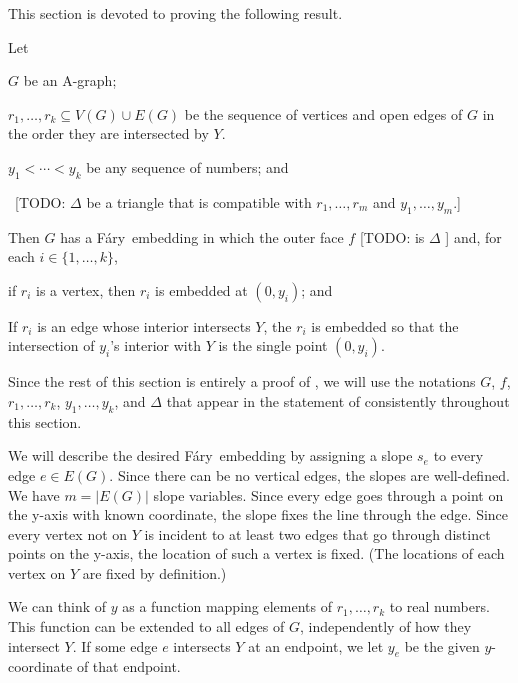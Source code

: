 \documentclass{patmorin}
\newcommand{\Fary}{Fáry}
\begin{document}
This section is devoted to proving the following result.

\begin{thm}
   Let
   \begin{compactenum}
     \item  $G$ be an A-graph;
     \item $r_1,\ldots,r_k \subseteq V(G)\cup E(G)$ be the sequence of vertices and open edges
           of $G$ in the order they are intersected by $Y$.
     \item $y_1<\cdots<y_k$ be any sequence of numbers; and
     \item \ [TODO: $\Delta$ be a triangle that is compatible with 
           $r_1,\ldots,r_m$ and $y_1,\ldots,y_m$.]
  \end{compactenum}
   Then $G$ has a
   \Fary\ embedding in which the outer face $f$ [TODO: is $\Delta$ ]
   and, for each $i\in\{1,\ldots,k\}$, 
   \begin{compactenum}
       \item if $r_i$ is a vertex, then $r_i$ is embedded at $(0,y_i)$; and 
       \item If $r_i$ is an edge whose interior intersects $Y$, the $r_i$
         is embedded so that the intersection of $y_i$'s interior with
         $Y$ is the single point $(0,y_i)$.
   \end{compactenum}
\end{thm}
Since the rest of this section is entirely a proof of ,
we will use the notations $G$, $f$, $r_1,\ldots,r_k$, $y_1,\ldots,y_k$,
and $\Delta$ that appear in the statement of  consistently
throughout this section.

We will describe the desired \Fary\ embedding by assigning a slope $s_e$
to every edge $e\in E(G)$.  Since there can be no vertical edges,
the slopes are well-defined.  We have $m=|E(G)|$ slope variables.
Since every edge goes through a point on the y-axis with known
coordinate, the slope fixes the line through the edge.  Since every
vertex not on $Y$ is incident to at least two edges that go through
distinct points on the y-axis, the location of such a vertex is fixed.
(The locations of each vertex on $Y$ are fixed by definition.)

We can think of $y$ as a function mapping elements of $r_1,\ldots,r_k$
to real numbers.  This function can be extended to all edges of $G$,
independently of how they intersect $Y$. If some edge $e$ intersects
$Y$ at an endpoint, we let $y_e$ be the given $y$-coordinate of that
endpoint.
\end{document}
